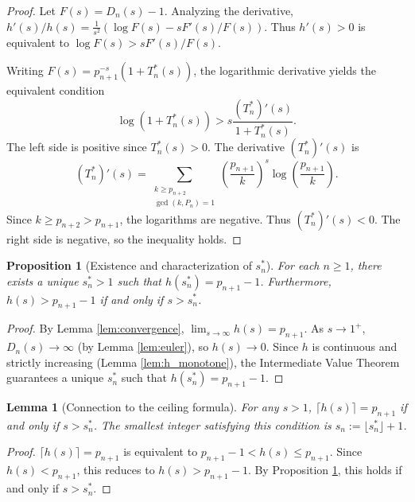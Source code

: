\documentclass[12pt]{article}
\theoremstyle{plain}
\newtheorem{lemma}[theorem]{Lemma}
\newtheorem{proposition}[theorem]{Proposition}
\theoremstyle{definition}
\theoremstyle{remark}
\begin{document}
\begin{proof}
Let $F(s)=D_n(s)-1$. Analyzing the derivative, $h'(s)/h(s) = \frac{1}{s^2}(\log F(s) - s F'(s)/F(s))$. Thus $h'(s) > 0$ is equivalent to $\log F(s) > s F'(s)/F(s)$.

Writing $F(s) = p_{n+1}^{-s}(1 + T_n^*(s))$, the logarithmic derivative yields the equivalent condition
\begin{equation}
\label{eq:monotonicity_condition}
\log(1 + T_n^*(s)) > s \frac{(T_n^*)'(s)}{1 + T_n^*(s)}.
\end{equation}
The left side is positive since $T_n^*(s)>0$. The derivative $(T_n^*)'(s)$ is
\[
(T_n^*)'(s) = \sum_{\substack{k \geq p_{n+2} \\ \gcd(k,P_n)=1}} \left(\frac{p_{n+1}}{k}\right)^s \log\left(\frac{p_{n+1}}{k}\right).
\]
Since $k \geq p_{n+2} > p_{n+1}$, the logarithms are negative. Thus $(T_n^*)'(s) < 0$. The right side is negative, so the inequality holds.
\end{proof}

\begin{proposition}[Existence and characterization of $s_n^*$]
\label{prop:existence_sn}
For each $n \geq 1$, there exists a unique $s_n^* > 1$ such that $h(s_n^*) = p_{n+1} - 1$. Furthermore, $h(s) > p_{n+1} - 1$ if and only if $s > s_n^*$.
\end{proposition}

\begin{proof}
By Lemma \ref{lem:convergence}, $\lim_{s\to\infty} h(s) = p_{n+1}$. As $s \to 1^+$, $D_n(s) \to \infty$ (by Lemma \ref{lem:euler}), so $h(s) \to 0$. Since $h$ is continuous and strictly increasing (Lemma \ref{lem:h_monotone}), the Intermediate Value Theorem guarantees a unique $s_n^*$ such that $h(s_n^*) = p_{n+1}-1$.
\end{proof}

\begin{lemma}[Connection to the ceiling formula]
\label{lem:sn_ceiling}
For any $s > 1$, $\lceil h(s) \rceil = p_{n+1}$ if and only if $s > s_n^*$.
The smallest integer satisfying this condition is $s_n := \lfloor s_n^* \rfloor + 1$.
\end{lemma}

\begin{proof}
$\lceil h(s) \rceil = p_{n+1}$ is equivalent to $p_{n+1} - 1 < h(s) \leq p_{n+1}$. Since $h(s) < p_{n+1}$, this reduces to $h(s) > p_{n+1} - 1$. By Proposition \ref{prop:existence_sn}, this holds if and only if $s > s_n^*$.
\end{proof}
\end{document}
